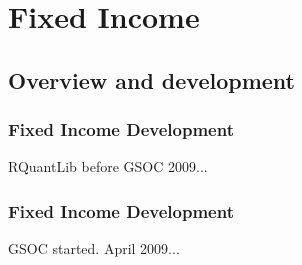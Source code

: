 \documentclass[compress]{beamer}
\begin{document}
\section{Fixed Income}
\subsection{Overview and development}

\begin{frame}
	\frametitle{Fixed Income Development}
	RQuantLib before GSOC 2009...
	\begin{center}
	\end{center}
\end{frame}
\begin{frame}
	\frametitle{Fixed Income Development}
	GSOC started. April 2009...
	\begin{center}
	\end{center}
\end{frame}
\end{document}
